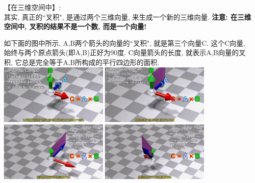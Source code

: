 \documentclass[UTF8]{ctexart}
\begin{document}
【在三维空间中】:\\
其实, 真正的``叉积", 是通过两个三维向量, 来生成一个新的三维向量. \textbf{注意: 在三维空间中, 叉积的结果不是一个数, 而是一个向量!} \\

\begin{myEnvSample}
	如下面的图中所示, A,B两个箭头的向量的``叉积", 就是第三个向量C. 这个C向量, 始终与两个原点箭头(即A,B)正好为90度.  C向量箭头的长度, 就表示A,B向量的叉积, 它总是完全等于A,B所构成的平行四边形的面积.\\
	
	\includegraphics[width=0.4\textwidth]{img/0076.png}
	\includegraphics[width=0.4\textwidth]{img/0077.png}\\
	\includegraphics[width=0.4\textwidth]{img/0078.png}
	\includegraphics[width=0.4\textwidth]{img/0079.png}\\
\end{myEnvSample}
\end{document}
